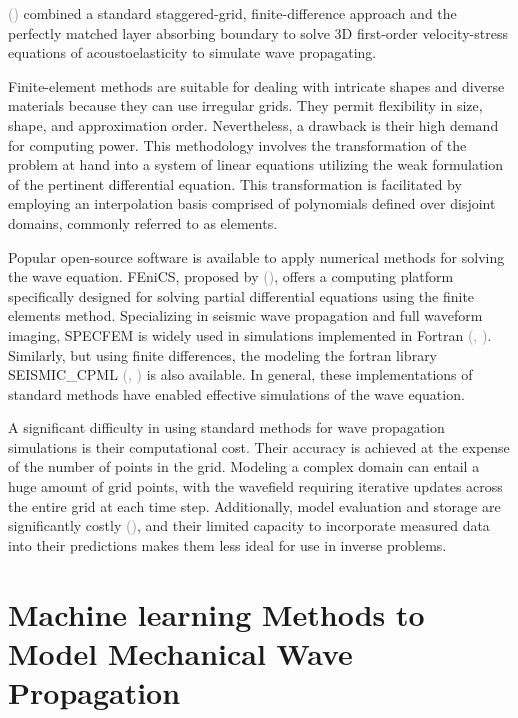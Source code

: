 \documentclass{tufte-handout}
\renewcommand{\citep}[2][]{\textcolor{gray}{(\citeauthor{#2}, \citeyear[#1]{#2})}}
\renewcommand{\citeauthoryear}[2][]{\textcolor{gray}{\citeauthor{#2} (\textcolor{gray}{\citeyear[#1]{#2}})}}
\begin{document}
\citeauthoryear{liu_simulation_2023} combined a standard staggered-grid, finite-difference approach and the perfectly matched layer absorbing boundary to solve 3D first-order velocity-stress equations of acoustoelasticity to simulate wave propagating.

Finite-element methods are suitable for dealing with intricate shapes and diverse materials because they can use irregular grids. They permit flexibility in size, shape, and approximation order. Nevertheless, a drawback is their high demand for computing power. This methodology involves the transformation of the problem at hand into a system of linear equations utilizing the weak formulation of the pertinent differential equation. This transformation is facilitated by employing an interpolation basis comprised of polynomials defined over disjoint domains, commonly referred to as elements.

Popular open-source software is available to apply numerical methods for solving the wave equation. FEniCS, proposed by \citeauthoryear{FEniCS}, offers a computing platform specifically designed for solving partial differential equations using the finite elements method. Specializing in seismic wave propagation and full waveform imaging, SPECFEM is widely used in simulations implemented in Fortran \citep{dimitri_komatitsch_2023_10415228,komatitsch_2024_10823181}. Similarly, but using finite differences, the modeling the fortran library SEISMIC\_CPML \citep{komatitsch_unsplit_2007} is also available. In general, these implementations of standard methods have enabled effective simulations of the wave equation. 

A significant difficulty in using standard methods for wave propagation simulations is their computational cost. Their accuracy is achieved at the expense of the number of points in the grid. Modeling a complex domain can entail a huge amount of grid points, with the wavefield requiring iterative updates across the entire grid at each time step. Additionally, model evaluation and storage are significantly costly \citeauthoryear{saloma_computational_1993}, and their limited capacity to incorporate measured data into their predictions makes them less ideal for use in inverse problems.

\section{Machine learning Methods to Model Mechanical Wave Propagation}\label{sec:dl_mwpm}
\end{document}
